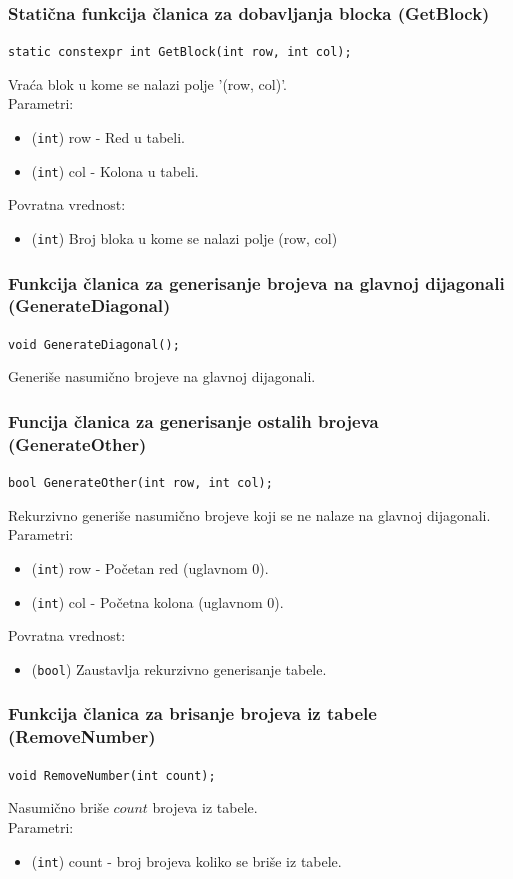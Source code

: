 \documentclass[a4paper]{article}
\begin{document}
    \subsubsection{Statična funkcija članica za dobavljanja blocka (GetBlock)}
    \texttt{static constexpr int GetBlock(int row, int col);}
    \par Vraća blok u kome se nalazi polje '(row, col)'.\\
    Parametri:
    \begin{itemize}
        \item (\texttt{int}) row - Red u tabeli.
        \item (\texttt{int}) col - Kolona u tabeli.
    \end{itemize}
    Povratna vrednost:
    \begin{itemize}
        \item (\texttt{int}) Broj bloka u kome se nalazi polje (row, col)
    \end{itemize}

    \subsubsection{Funkcija članica za generisanje brojeva na glavnoj dijagonali (GenerateDiagonal)}
	\texttt{void GenerateDiagonal();}
	\par Generiše nasumično brojeve na glavnoj dijagonali.

    \subsubsection{Funcija članica za generisanje ostalih brojeva (GenerateOther)}
    \texttt{bool GenerateOther(int row, int col);}
    \par Rekurzivno generiše nasumično brojeve koji se ne nalaze na glavnoj dijagonali.\\
	Parametri:
    \begin{itemize}
        \item (\texttt{int}) row - Početan red (uglavnom 0).
        \item (\texttt{int}) col - Početna kolona (uglavnom 0).
    \end{itemize}
    Povratna vrednost:
    \begin{itemize}
        \item (\texttt{bool}) Zaustavlja rekurzivno generisanje tabele.
    \end{itemize}

    \subsubsection{Funkcija članica za brisanje brojeva iz tabele (RemoveNumber)}
	\texttt{void RemoveNumber(int count);}
    \par Nasumično briše $count$ brojeva iz tabele.\\
    Parametri:
    \begin{itemize}
        \item (\texttt{int}) count - broj brojeva koliko se briše iz tabele.
    \end{itemize}
\end{document}
